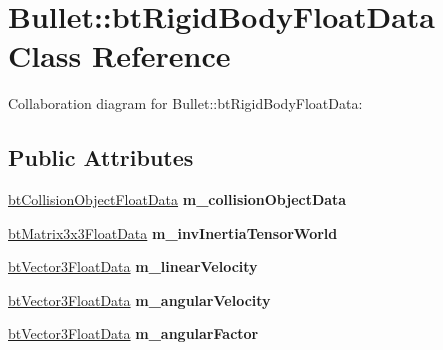 \hypertarget{class_bullet_1_1bt_rigid_body_float_data}{\section{Bullet\+:\+:bt\+Rigid\+Body\+Float\+Data Class Reference}
\label{class_bullet_1_1bt_rigid_body_float_data}
}


Collaboration diagram for Bullet\+:\+:bt\+Rigid\+Body\+Float\+Data\+:
\subsection*{Public Attributes}
\begin{DoxyCompactItemize}
\item 
\hypertarget{class_bullet_1_1bt_rigid_body_float_data_ae185d637298821a6996e4974f47d0af2}{\hyperlink{class_bullet_1_1bt_collision_object_float_data}{bt\+Collision\+Object\+Float\+Data} {\bfseries m\+\_\+collision\+Object\+Data}}\label{class_bullet_1_1bt_rigid_body_float_data_ae185d637298821a6996e4974f47d0af2}

\item 
\hypertarget{class_bullet_1_1bt_rigid_body_float_data_a157c468e373abf2cb1c9361e5d16b8a3}{\hyperlink{class_bullet_1_1bt_matrix3x3_float_data}{bt\+Matrix3x3\+Float\+Data} {\bfseries m\+\_\+inv\+Inertia\+Tensor\+World}}\label{class_bullet_1_1bt_rigid_body_float_data_a157c468e373abf2cb1c9361e5d16b8a3}

\item 
\hypertarget{class_bullet_1_1bt_rigid_body_float_data_affc128355b16c3ae1cb37bf3b02a5d97}{\hyperlink{class_bullet_1_1bt_vector3_float_data}{bt\+Vector3\+Float\+Data} {\bfseries m\+\_\+linear\+Velocity}}\label{class_bullet_1_1bt_rigid_body_float_data_affc128355b16c3ae1cb37bf3b02a5d97}

\item 
\hypertarget{class_bullet_1_1bt_rigid_body_float_data_ac645da06348066f35bcd2954e4e17060}{\hyperlink{class_bullet_1_1bt_vector3_float_data}{bt\+Vector3\+Float\+Data} {\bfseries m\+\_\+angular\+Velocity}}\label{class_bullet_1_1bt_rigid_body_float_data_ac645da06348066f35bcd2954e4e17060}

\item 
\hypertarget{class_bullet_1_1bt_rigid_body_float_data_a22c6a10a26b6a8d9d5a2ae945c120793}{\hyperlink{class_bullet_1_1bt_vector3_float_data}{bt\+Vector3\+Float\+Data} {\bfseries m\+\_\+angular\+Factor}}\label{class_bullet_1_1bt_rigid_body_float_data_a22c6a10a26b6a8d9d5a2ae945c120793}


\end{DoxyCompactItemize}
